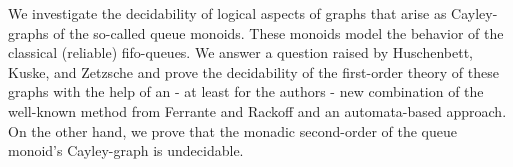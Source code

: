 We investigate the decidability of logical aspects of graphs that arise as Cayley-graphs of the so-called queue monoids. These monoids model the behavior of the classical (reliable) fifo-queues. We answer a question raised by Huschenbett, Kuske, and Zetzsche and prove the decidability of the first-order theory of these graphs with the help of an - at least for the authors - new combination of the well-known method from Ferrante and Rackoff and an automata-based approach. On the other hand, we prove that the monadic second-order of the queue monoid's Cayley-graph is undecidable.